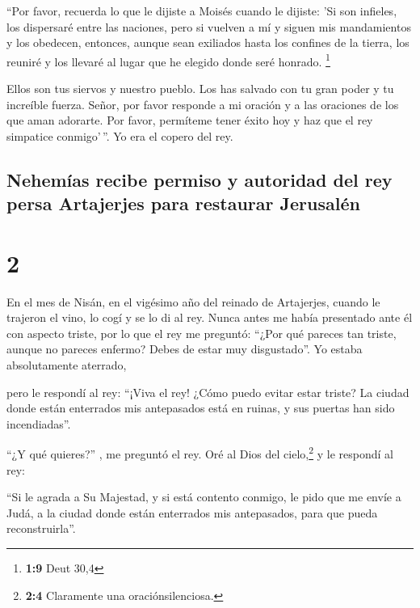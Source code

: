  ``Por favor, recuerda lo que le dijiste a Moisés cuando
le dijiste: 'Si son infieles, los dispersaré entre las naciones,
 pero si vuelven a mí y siguen mis mandamientos y los
obedecen, entonces, aunque sean exiliados hasta los confines de la
tierra, los reuniré y los llevaré al lugar que he elegido donde seré
honrado. \footnote{\textbf{1:9} Deut 30,4}

 Ellos son tus siervos y nuestro pueblo. Los has salvado
con tu gran poder y tu increíble fuerza.  Señor, por
favor responde a mi oración y a las oraciones de los que aman adorarte.
Por favor, permíteme tener éxito hoy y haz que el rey simpatice
conmigo'\,''. Yo era el copero del rey.

\hypertarget{nehemuxedas-recibe-permiso-y-autoridad-del-rey-persa-artajerjes-para-restaurar-jerusaluxe9n}{%
\subsection{Nehemías recibe permiso y autoridad del rey persa Artajerjes
para restaurar
Jerusalén}\label{nehemuxedas-recibe-permiso-y-autoridad-del-rey-persa-artajerjes-para-restaurar-jerusaluxe9n}}

\hypertarget{section-1}{%
\section{2}\label{section-1}}

 En el mes de Nisán, en el vigésimo año del reinado de
Artajerjes, cuando le trajeron el vino, lo cogí y se lo di al rey. Nunca
antes me había presentado ante él con aspecto triste,  por
lo que el rey me preguntó: ``¿Por qué pareces tan triste, aunque no
pareces enfermo? Debes de estar muy disgustado''. Yo estaba
absolutamente aterrado,

 pero le respondí al rey: ``¡Viva el rey! ¿Cómo puedo
evitar estar triste? La ciudad donde están enterrados mis antepasados
está en ruinas, y sus puertas han sido incendiadas''.

 ``¿Y qué quieres?'' , me preguntó el rey. Oré al Dios del
cielo,\footnote{\textbf{2:4} Claramente una oraciónsilenciosa.} y le
respondí al rey:

 ``Si le agrada a Su Majestad, y si está contento conmigo,
le pido que me envíe a Judá, a la ciudad donde están enterrados mis
antepasados, para que pueda reconstruirla''.

